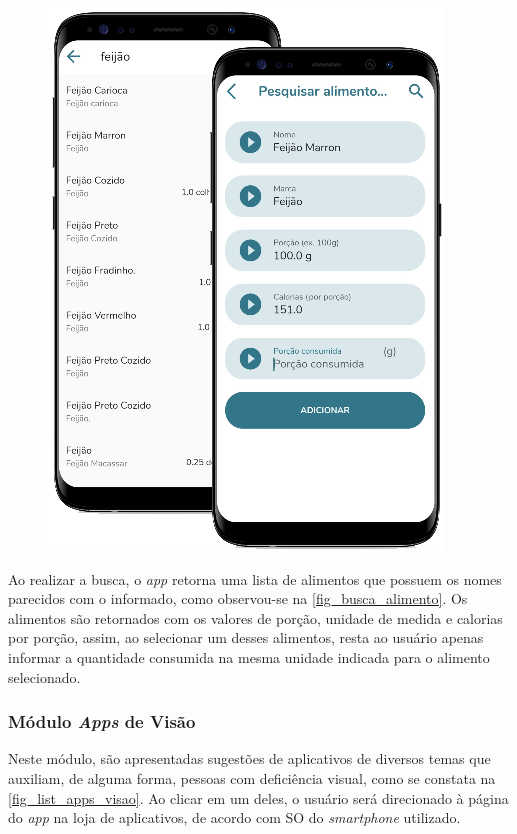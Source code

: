 \begin{figure}[htb]
\begin{minipage}{0.58\textwidth}
        \includegraphics[scale=0.66]{Imagens/desenvolvimento/app/busca_alimento.png}
    \end{minipage}
\end{figure}

Ao realizar a busca, o \emph{app} retorna uma lista de alimentos que possuem os nomes parecidos com o
informado, como observou-se na \autoref{fig_busca_alimento}. Os alimentos são retornados com os valores de
porção, unidade de medida e calorias por porção, assim, ao selecionar um desses alimentos, resta ao usuário
apenas informar a quantidade consumida na mesma unidade indicada para o alimento selecionado.

\newpage

\subsubsection{Módulo \emph{Apps} de Visão}

Neste módulo, são apresentadas sugestões de aplicativos de diversos temas que auxiliam, de alguma forma, pessoas
com deficiência visual, como se constata na \autoref{fig_list_apps_visao}. Ao clicar em um deles, o usuário será
direcionado à página do \emph{app} na loja de aplicativos, de acordo com SO do \emph{smartphone} utilizado.

